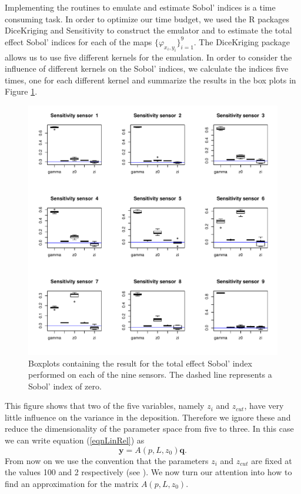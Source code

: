 \documentclass{sfuthesis}
\newcommand{\y}{\textbf{y}}
\begin{document}
Implementing the routines to  emulate  and estimate
 Sobol' indices is a time consuming task. In order to optimize our time budget, we used
the R packages DiceKriging and Sensitivity \cite{DiceKriging,sensitivity} to construct the
emulator and to  estimate the total
effect Sobol' indices for each of the maps  $\{\varphi_{x_{i},y_{i}}\}_{i=1}^{9}$.  
The DiceKriging package allows us to use five different kernels for the emulation.
In order to consider the influence of different kernels on the Sobol'
indices, we calculate the indices five times, one for each different kernel and summarize
the results in the box plots in Figure \ref{figSensitivityPlot}. 


\begin{figure}[H]
\centering
\includegraphics[scale=0.70]{./FigChap4/sensitivityPlot}
\caption{Boxplots containing the result  for the total effect Sobol' index performed on each of the nine sensors.
The dashed line represents a Sobol' index of zero.}
\label{figSensitivityPlot}
\end{figure}
\noindent This figure shows that two of the five variables, namely $z_{i}$ and $z_{cut}$, have very little influence on the variance 
in the deposition. Therefore we ignore these and reduce the dimensionality of the parameter
space from five to three. In this case we can write equation (\ref{eqnLinRel}) as 
\begin{equation*}
\y=A(p,L,z_{0})\textbf{q}.
\end{equation*}  
From now on we use the convention that the parameters $z_{i}$ and $z_{cut}$ 
are  fixed at the values 100 and 2 respectively (see \cite{hosseini2016airborne}).  
We now turn our attention into how to find an approximation for the 
matrix $A(p,L,z_{0})$.
\newline
\end{document}
